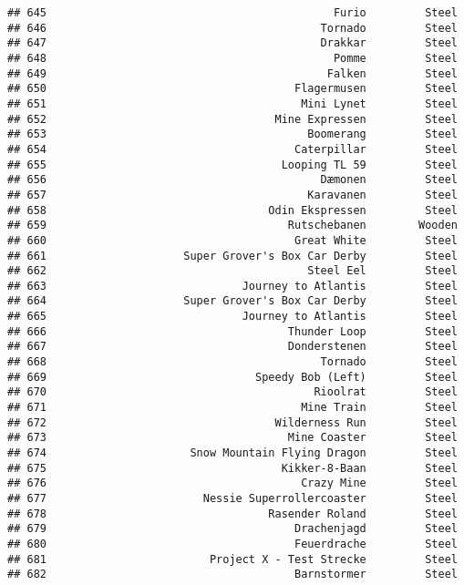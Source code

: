 \documentclass[
]{article}
\begin{document}
\begin{verbatim}
## 645                                            Furio         Steel
## 646                                          Tornado         Steel
## 647                                          Drakkar         Steel
## 648                                            Pomme         Steel
## 649                                           Falken         Steel
## 650                                      Flagermusen         Steel
## 651                                       Mini Lynet         Steel
## 652                                   Mine Expressen         Steel
## 653                                        Boomerang         Steel
## 654                                      Caterpillar         Steel
## 655                                    Looping TL 59         Steel
## 656                                          Dæmonen         Steel
## 657                                        Karavanen         Steel
## 658                                  Odin Ekspressen         Steel
## 659                                     Rutschebanen        Wooden
## 660                                      Great White         Steel
## 661                     Super Grover's Box Car Derby         Steel
## 662                                        Steel Eel         Steel
## 663                              Journey to Atlantis         Steel
## 664                     Super Grover's Box Car Derby         Steel
## 665                              Journey to Atlantis         Steel
## 666                                     Thunder Loop         Steel
## 667                                     Donderstenen         Steel
## 668                                          Tornado         Steel
## 669                                Speedy Bob (Left)         Steel
## 670                                         Rioolrat         Steel
## 671                                       Mine Train         Steel
## 672                                   Wilderness Run         Steel
## 673                                     Mine Coaster         Steel
## 674                      Snow Mountain Flying Dragon         Steel
## 675                                    Kikker-8-Baan         Steel
## 676                                       Crazy Mine         Steel
## 677                        Nessie Superrollercoaster         Steel
## 678                                  Rasender Roland         Steel
## 679                                      Drachenjagd         Steel
## 680                                      Feuerdrache         Steel
## 681                         Project X - Test Strecke         Steel
## 682                                      Barnstormer         Steel

\end{verbatim}
\end{document}
